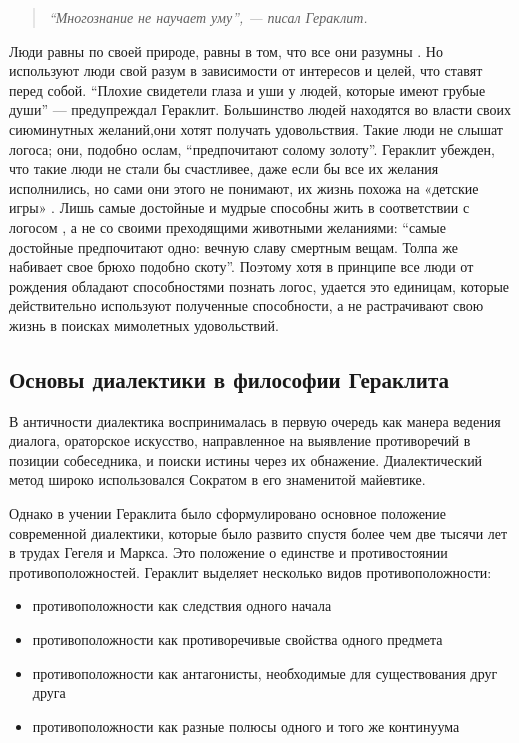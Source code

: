 \documentclass[a4paper, 14pt]{extreport}
\begin{document}
\begin{quote}
\emph{``Многознание не научает уму'', --- писал Гераклит.}
\end{quote}

Люди равны по своей природе, равны в том, что все они разумны . Но
используют люди свой разум в зависимости от интересов и целей, что
ставят перед собой. ``Плохие свидетели глаза и уши у людей, которые
имеют грубые души'' --- предупреждал Гераклит. Большинство людей
находятся во власти своих сиюминутных желаний,они хотят получать
удовольствия. Такие люди не слышат логоса; они, подобно ослам,
``предпочитают солому золоту''. Гераклит убежден, что такие люди не
стали бы счастливее, даже если бы все их желания исполнились, но сами
они этого не понимают, их жизнь похожа на «детские игры» . Лишь самые
достойные и мудрые способны жить в соответствии с логосом , а не со
своими преходящими животными желаниями: ``самые достойные предпочитают
одно: вечную славу смертным вещам. Толпа же набивает свое брюхо подобно
скоту''. Поэтому хотя в принципе все люди от рождения обладают
способностями познать логос, удается это единицам, которые действительно
используют полученные способности, а не растрачивают свою жизнь в
поисках мимолетных удовольствий.

\subsection{Основы диалектики в философии Гераклита}

В античности диалектика воспринималась в первую очередь как манера
ведения диалога, ораторское искусство, направленное на выявление
противоречий в позиции собеседника, и поиски истины через их обнажение.
Диалектический метод широко использовался Сократом в его знаменитой
майевтике.

Однако в учении Гераклита было сформулировано основное положение
современной диалектики, которые было развито спустя более чем две тысячи
лет в трудах Гегеля и Маркса. Это положение о единстве и противостоянии
противоположностей. Гераклит выделяет несколько видов противоположности:

\begin{itemize}

\item
  противоположности как следствия одного начала
\item
  противоположности как противоречивые свойства одного предмета
\item
  противоположности как антагонисты, необходимые для существования друг
  друга
\item
  противоположности как разные полюсы одного и того же континуума
\end{itemize}
\end{document}
